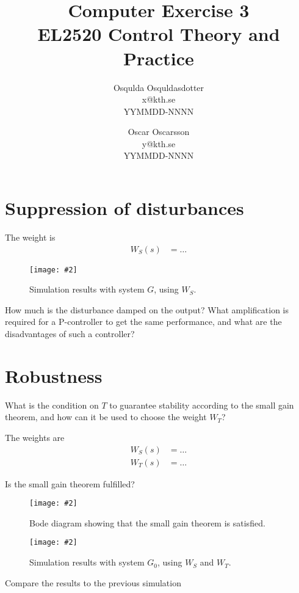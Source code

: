 \documentclass[a4paper,11pt]{article}
\title{
	Computer Exercise 3\\
	EL2520 Control Theory and Practice
}
\author{
	Osqulda Osquldasdotter\\
	x@kth.se\\
	YYMMDD-NNNN
	\and
	Oscar Oscarsson\\
	y@kth.se\\
	YYMMDD-NNNN
}
\newcommand{\image}[3][width=1.0\columnwidth]{
	\begin{figure}[h!]
		\centering
	    \texttt{[image: \#2]}
		\caption{#3}
		\label{fig:#2}
	\end{figure}
}
\begin{document}
	\maketitle

	\section*{Suppression of disturbances}

	The weight is
	\begin{align*}
		W_S(s) &= \ldots
	\end{align*}

	\image{figure_1.pdf}{Simulation results with system $G$, using $W_S$.}

	How much is the disturbance damped on the output?
	What amplification is required for a P-controller to get the same performance, and what are the disadvantages of such a controller?
	\par\dotfill\par\dotfill\par

	\section*{Robustness}
	What is the condition on $T$ to guarantee stability according to the small gain theorem, and how can it be used to choose the weight $W_T$?
	\par\dotfill\par\dotfill\par

	The weights are
	\begin{align*}
		W_S(s) &= \ldots\\
		W_T(s) &= \ldots
	\end{align*}

	Is the small gain theorem fulfilled?
	\par\dotfill\par\dotfill\par

	\image{figure_2.pdf}{Bode diagram showing that the small gain theorem is satisfied.}

	\image{figure_3.pdf}{Simulation results with system $G_0$, using $W_S$ and $W_T$.}

	Compare the results to the previous simulation
	\par\dotfill\par\dotfill\par
\end{document}
